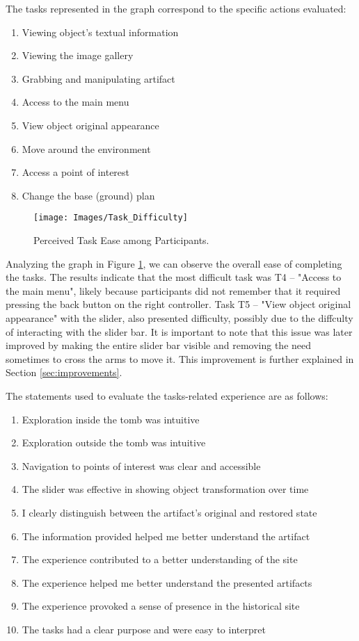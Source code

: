 The tasks represented in the graph correspond to the specific actions evaluated:

\begin{enumerate}[label=T\arabic* --]
    \item Viewing object's textual information
    \item Viewing the image gallery
    \item Grabbing and manipulating artifact
    \item Access to the main menu
    \item View object original appearance
    \item Move around the environment
    \item Access a point of interest
    \item Change the base (ground) plan
\end{enumerate}


\begin{figure}[h!]
    \centering
    \texttt{[image: Images/Task\_Difficulty]}
    \caption{Perceived Task Ease among Participants.} 
    \label{fig:diffculty}
\end{figure}

Analyzing the graph in Figure \ref{fig:diffculty}, we can observe the overall ease of completing the tasks.
The results indicate that the most difficult task was T4 – "Access to the main menu", likely because participants did not remember that it required pressing the back button on the right controller. 
Task T5 – "View object original appearance" with the slider, also presented difficulty, possibly due to the diffculty of interacting with the slider bar. 
It is important to note that this issue was later improved by making the entire slider bar visible and removing the need sometimes to cross the arms to move it. 
This improvement is further explained in Section \ref{sec:improvements}.

The statements used to evaluate the tasks-related experience are as follows:

\begin{enumerate}[label=S\arabic* --]
    \item Exploration inside the tomb was intuitive
    \item Exploration outside the tomb was intuitive
    \item Navigation to points of interest was clear and accessible
    \item The slider was effective in showing object transformation over time
    \item I clearly distinguish between the artifact's original and restored state
    \item The information provided helped me better understand the artifact
    \item The experience contributed to a better understanding of the site
    \item The experience helped me better understand the presented artifacts
    \item The experience provoked a sense of presence in the historical site
    \item The tasks had a clear purpose and were easy to interpret
\end{enumerate}

